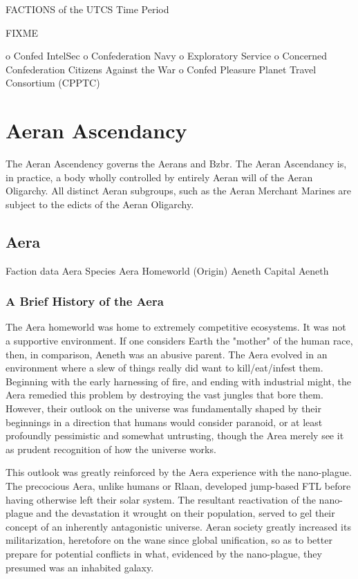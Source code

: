 FACTIONS of the UTCS Time Period


FIXME

o	Confed IntelSec 
o	Confederation Navy 
o	Exploratory Service 
o	Concerned Confederation Citizens Against the War 
o	Confed Pleasure Planet Travel Consortium (CPPTC) 

\section{Aeran Ascendancy}

The Aeran Ascendency governs the Aerans and Bzbr. The Aeran Ascendancy
is, in practice, a body wholly controlled by entirely Aeran will of
the Aeran Oligarchy. All distinct Aeran subgroups, such as the Aeran
Merchant Marines are subject to the edicts of the Aeran Oligarchy.

\subsection{Aera}
Faction data 
Aera 
Species 	Aera 
Homeworld (Origin) 	Aeneth 
Capital 	Aeneth 


\subsubsection{A Brief History of the Aera}

The Aera homeworld was home to extremely competitive ecosystems. It
was not a supportive environment. If one considers Earth the "mother"
of the human race, then, in comparison, Aeneth was an abusive
parent. The Aera evolved in an environment where a slew of things
really did want to kill/eat/infest them. Beginning with the early
harnessing of fire, and ending with industrial might, the Aera
remedied this problem by destroying the vast jungles that bore
them. However, their outlook on the universe was fundamentally shaped
by their beginnings in a direction that humans would consider
paranoid, or at least profoundly pessimistic and somewhat untrusting,
though the Area merely see it as prudent recognition of how the
universe works.

This outlook was greatly reinforced by the Aera experience with the
nano-plague. The precocious Aera, unlike humans or Rlaan, developed
jump-based FTL before having otherwise left their solar system. The
resultant reactivation of the nano-plague and the devastation it
wrought on their population, served to gel their concept of an
inherently antagonistic universe. Aeran society greatly increased its
militarization, heretofore on the wane since global unification, so as
to better prepare for potential conflicts in what, evidenced by the
nano-plague, they presumed was an inhabited galaxy.

